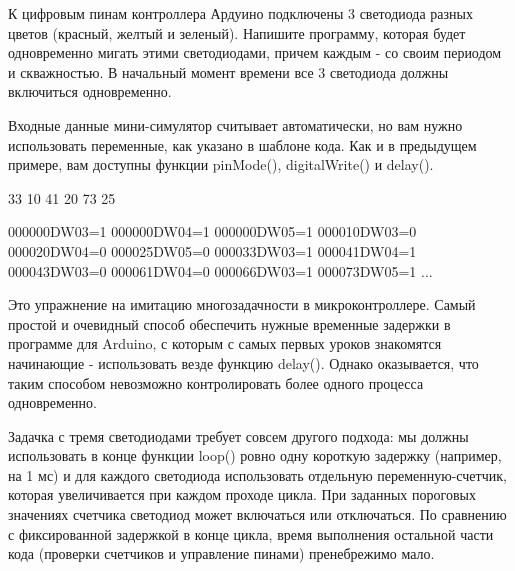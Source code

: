 
К цифровым пинам контроллера Ардуино подключены 3 светодиода разных цветов (красный, желтый и зеленый).   Напишите
программу, которая будет одновременно мигать этими светодиодами, причем каждым - со своим периодом и скважностью.  
В начальный момент времени все 3 светодиода должны включиться одновременно. 

Входные данные мини-симулятор считывает автоматически, но вам нужно использовать переменные, как указано в шаблоне кода.  Как и в предыдущем примере, вам доступны функции pinMode(), digitalWrite() и delay().

\begin{myverbbox}[\small]{\vinput}
    33 10 41 20 73 25
\end{myverbbox}
\begin{myverbbox}[\small]{\voutput}
    000000DW03=1
    000000DW04=1
    000000DW05=1
    000010DW03=0
    000020DW04=0
    000025DW05=0
    000033DW03=1
    000041DW04=1
    000043DW03=0
    000061DW04=0
    000066DW03=1
    000073DW05=1
    ...
\end{myverbbox}

\solutionSection

Это упражнение на имитацию многозадачности в микроконтроллере.  Самый простой и очевидный способ обеспечить нужные временные задержки в программе для Arduino, с которым с самых первых уроков знакомятся начинающие - использовать везде функцию delay(). Однако оказывается, что таким способом невозможно контролировать более одного процесса одновременно.  

Задачка с тремя светодиодами требует совсем другого подхода:  мы должны использовать в конце функции loop() ровно одну короткую задержку (например, на 1 мс) и для каждого светодиода использовать отдельную переменную-счетчик,  которая увеличивается при каждом проходе цикла.  При заданных пороговых значениях счетчика светодиод может включаться или отключаться.  По сравнению с фиксированной задержкой в конце цикла, время выполнения остальной части кода (проверки счетчиков и управление пинами) пренебрежимо мало.

